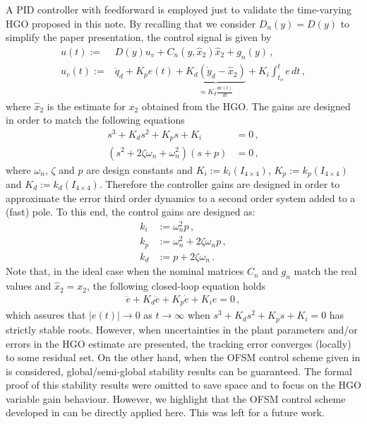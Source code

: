 \documentclass[letterpaper, 10 pt, journal, twocolumn]{IEEEtran}  %
\theoremstyle{plain}
\theoremstyle{definition}
\theoremstyle{remark}
\begin{document}
A  PID controller with feedforward is employed just to validate the time-varying HGO proposed in this note. By recalling that we  consider $D_n(y)=D(y)$ to simplify the paper presentation, the control  signal is given by
%
\begin{align}
u(t) := & D(y) u_v + C_{n}(y,\hat{x}_2) \hat{x}_2+g_{n}(y)\,, \\
u_v(t):= &\ddot{q}_d + K_p e(t) + \underbrace{K_d (\dot{y}_d - \hat{x}_2)}_{\approx K_d \frac{de(t)}{dt}} + K_i\int_{t_o}^{t}e \, dt\,,
\label{eq:defu}
\end{align}
%
where $\hat{x}_2$ is the estimate for $x_2$ obtained from the HGO. The gains are designed in order to match the following equations
%
\begin{align}
	s^3 + K_ds^2 + K_ps + K_i &= 0\,, \\
	(s^2 + 2\zeta \omega_n + \omega_n^2)(s + p) &= 0\,,
\end{align}
%
where $\omega_n$, $\zeta$ and $p$ are design constants and $K_i := k_i(I_{4 \times 4})$, $K_p := k_p(I_{4 \times 4})$ and $K_d := k_d(I_{4 \times 4})$. Therefore the controller gains are designed in order to approximate the error third order dynamics to a second order system added to a (fast) pole. To this end, the control gains are designed as:
%
\begin{align}
	k_i &:= \omega_n^2p\,, \\
	k_p &:= \omega_n^2 + 2\zeta \omega_n p\,, \\
	k_d &:= p + 2\zeta \omega_n\,. 
\end{align}
%
Note that, in the ideal case when the nominal matrices $C_n$ and $g_n$ match the real values and $\hat{x}_2=x_2$, the following closed-loop equation holds
%
\begin{align}
\dddot{e} + K_d \ddot{e} + K_p \dot{e} + K_i e =0\,,
\label{eq:closed}
\end{align}
%
which assures that $|e(t)| \rightarrow 0$ as $t \rightarrow \infty$ when  $s^3 + K_d s^2 + K_p s + K_i = 0$ has strictly stable roots. However, when uncertainties in the plant parameters and/or errors in the HGO estimate are presented, the tracking error converges (locally) to some residual set. On the other hand, when the OFSM control scheme given in \cite{POH:2011} is considered, global/semi-global stability results can be guaranteed. The formal proof of this stability results were omitted to save space and to focus on the HGO variable gain behaviour. However, we highlight that  the OFSM control scheme developed in \cite{POH:2011} can be directly applied here. This was left for a future work. 
\end{document}
